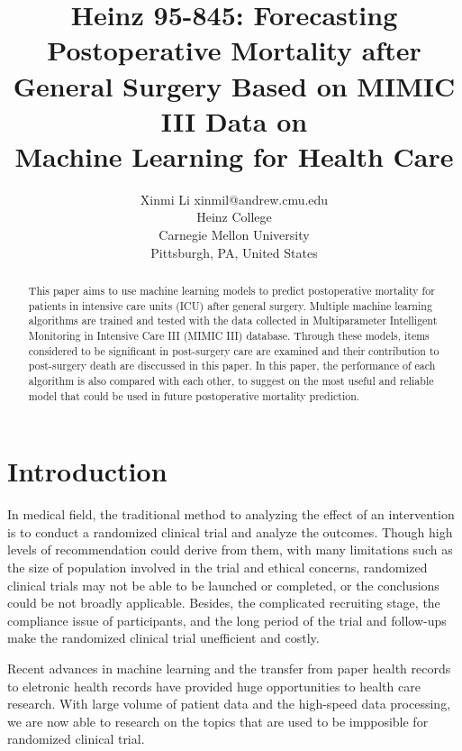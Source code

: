 \documentclass[twoside,11pt]{article}
\begin{document}
\title{Heinz 95-845: Forecasting Postoperative Mortality after General Surgery Based on MIMIC III Data on \\Machine Learning for Health Care}

\author{\name Xinmi Li \email xinmil@andrew.cmu.edu \\
       \addr Heinz College\\
       Carnegie Mellon University\\
       Pittsburgh, PA, United States
       } 

\maketitle

\begin{abstract}
  This paper aims to use machine learning models to predict postoperative mortality for patients in intensive care units (ICU) after general surgery. Multiple machine learning algorithms are trained and tested with the data collected in Multiparameter Intelligent Monitoring in Intensive Care III (MIMIC III) database. Through these models, items considered to be significant in post-surgery care are examined and their contribution to post-surgery death are disccussed in this paper. In this paper, the performance of each algorithm is also compared with each other, to suggest on the most useful and reliable model that could be used in future postoperative mortality prediction.
\end{abstract}

\section{Introduction}
In medical field, the traditional method to analyzing the effect of an intervention is to conduct a randomized clinical trial and analyze the outcomes. Though high levels of recommendation could derive from them, with many limitations such as the size of population involved in the trial and ethical concerns, randomized clinical trials may not be able to be launched or completed, or the conclusions could be not broadly applicable. Besides, the complicated recruiting stage, the compliance issue of participants, and the long period of the trial and follow-ups make the randomized clinical trial unefficient and costly.

Recent advances in machine learning and the transfer from paper health records to eletronic health records have provided huge opportunities to health care research. With large volume of patient data and the high-speed data processing, we are now able to research on the topics that are used to be impposible for randomized clinical trial. 
\end{document}
